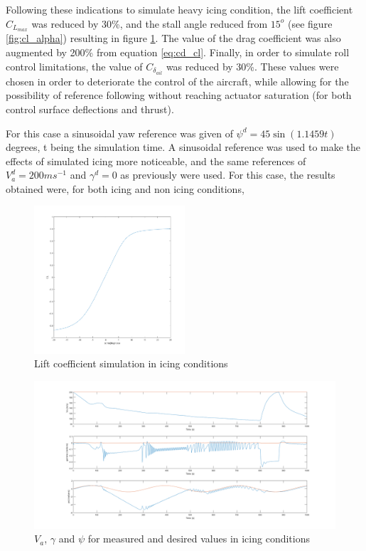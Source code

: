 Following these indications to simulate heavy icing condition, the lift coefficient $C_{L_{max}}$ was reduced by 30\%, and the stall angle reduced from $15^o$ (see figure \ref{fig:cl_alpha}) resulting in figure \ref{fig:cl_icing}. The value of the drag coefficient was also augmented by 200\% from equation \ref{eq:cd_cl}. Finally, in order to simulate roll control limitations, the value of $C_{\delta_{ail}}$ was reduced by 30\%. These values were chosen in order to deteriorate the control of the aircraft, while allowing for the possibility of reference following without reaching actuator saturation (for both control surface deflections and thrust). 

For this case a sinusoidal yaw reference was given of $\psi^d= 45 \sin (1.1459t)$ degrees, t being the simulation time. A sinusoidal reference was used to make the effects of simulated icing more noticeable, and the same references of $V_a^d=200ms^{-1}$ and $\gamma^d=0$ as previously were used. For this case, the results obtained were, for both icing and non icing conditions,

\begin{figure}[H]
\centering
\includegraphics[width=0.5\textwidth]{Figures/Results/cl_icing.PNG}
\caption[Lift coefficient simulation in icing conditions]{Lift coefficient simulation in icing conditions}
\label{fig:cl_icing}
\end{figure}

\begin{figure}[H]
\centering
\includegraphics[width=1\textwidth]{Figures/Results/ref_icing.PNG}
\caption[Reference following in icing conditions]{$V_a$, $\gamma$ and $\psi$ for measured and desired values in icing conditions}
\label{fig:ref_icing}
\end{figure}

